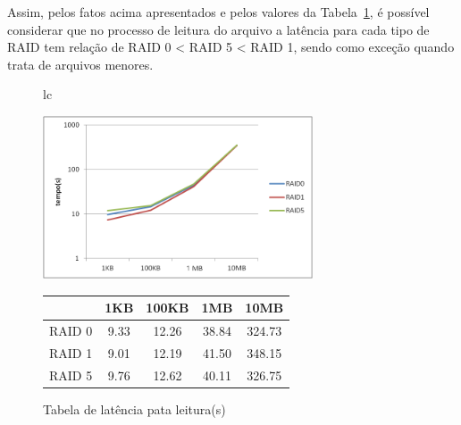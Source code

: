 	Assim, pelos fatos acima apresentados e pelos valores da Tabela~\ref{tab:latencia_l}, é possível considerar que no processo de leitura do arquivo a latência para cada tipo de RAID tem relação de RAID 0 < RAID 5 < RAID 1, sendo como exceção quando trata de arquivos menores.
	\\
	
	\begin{figure}[h]
		\begin{tabular}{lc}
			\begin{minipage}{.50\textwidth}
				\begin{center}
					
					\includegraphics[clip,width=8.0cm]{images/resultados/latencia_leitura.png}
					\caption{Gráfico de latência pata leitura}
					\label{fig:latencia_l}
					
				\end{center}
				
			\end{minipage}
			
			\begin{minipage}{.5\textwidth}
				\makeatletter
				\def\@captype{table}
				\makeatother
				\caption{Tabela de latência pata leitura(s)}
				\label{tab:latencia_l}
				\begin{center}
					\begin{tabular}{|c|c|c|c|c|} \hline
								& 1KB  & 100KB & 1MB   & 10MB  \\ \hline
						RAID 0	& 9.33 & 12.26 & 38.84 & 324.73\\ \hline
						RAID 1	& 9.01 & 12.19 & 41.50 & 348.15\\ \hline
						RAID 5	& 9.76 & 12.62 & 40.11 & 326.75\\ \hline
						
						
					\end{tabular}
				\end{center}
				
			\end{minipage}
		\end{tabular}
	\end{figure}
	
